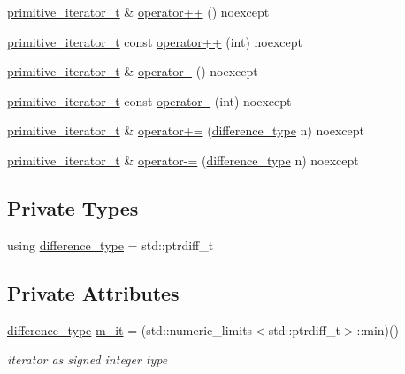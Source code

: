 \begin{DoxyCompactItemize}
\item 
\hyperlink{classnlohmann_1_1detail_1_1primitive__iterator__t}{primitive\+\_\+iterator\+\_\+t} \& \hyperlink{classnlohmann_1_1detail_1_1primitive__iterator__t_ad26511012fc88f3ec5d9e1cb708732fd}{operator++} () noexcept
\item 
\hyperlink{classnlohmann_1_1detail_1_1primitive__iterator__t}{primitive\+\_\+iterator\+\_\+t} const \hyperlink{classnlohmann_1_1detail_1_1primitive__iterator__t_aa011863621357b3cf891670bf63a48b1}{operator++} (int) noexcept
\item 
\hyperlink{classnlohmann_1_1detail_1_1primitive__iterator__t}{primitive\+\_\+iterator\+\_\+t} \& \hyperlink{classnlohmann_1_1detail_1_1primitive__iterator__t_abecbf0c73c7fe963a699738065177bc3}{operator-\/-\/} () noexcept
\item 
\hyperlink{classnlohmann_1_1detail_1_1primitive__iterator__t}{primitive\+\_\+iterator\+\_\+t} const \hyperlink{classnlohmann_1_1detail_1_1primitive__iterator__t_aef3b5dfeb2cb04dc9d0a024fc1898b98}{operator-\/-\/} (int) noexcept
\item 
\hyperlink{classnlohmann_1_1detail_1_1primitive__iterator__t}{primitive\+\_\+iterator\+\_\+t} \& \hyperlink{classnlohmann_1_1detail_1_1primitive__iterator__t_aee01535df0b3b40137d9241029a9a203}{operator+=} (\hyperlink{classnlohmann_1_1detail_1_1primitive__iterator__t_af3db0d5c90de427d51645fe73a015553}{difference\+\_\+type} n) noexcept
\item 
\hyperlink{classnlohmann_1_1detail_1_1primitive__iterator__t}{primitive\+\_\+iterator\+\_\+t} \& \hyperlink{classnlohmann_1_1detail_1_1primitive__iterator__t_a0bf83ab08abe1ae4b51c790c85cdf151}{operator-\/=} (\hyperlink{classnlohmann_1_1detail_1_1primitive__iterator__t_af3db0d5c90de427d51645fe73a015553}{difference\+\_\+type} n) noexcept
\end{DoxyCompactItemize}
\subsection*{Private Types}
\begin{DoxyCompactItemize}
\item 
using \hyperlink{classnlohmann_1_1detail_1_1primitive__iterator__t_af3db0d5c90de427d51645fe73a015553}{difference\+\_\+type} = std\+::ptrdiff\+\_\+t
\end{DoxyCompactItemize}
\subsection*{Private Attributes}
\begin{DoxyCompactItemize}
\item 
\hyperlink{classnlohmann_1_1detail_1_1primitive__iterator__t_af3db0d5c90de427d51645fe73a015553}{difference\+\_\+type} \hyperlink{classnlohmann_1_1detail_1_1primitive__iterator__t_a4357355113b0cd7e12b15c2e93703510}{m\+\_\+it} = (std\+::numeric\+\_\+limits$<$std\+::ptrdiff\+\_\+t$>$\+::min)()
\begin{DoxyCompactList}\small\item\em iterator as signed integer type \end{DoxyCompactList}\end{DoxyCompactItemize}
